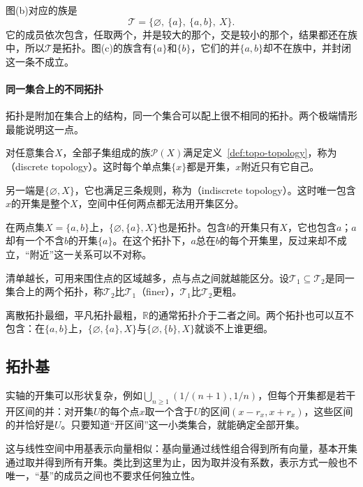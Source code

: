 图(b)对应的族是
\[
 \mathcal T=\bigl\{\varnothing,\ \{a\},\ \{a,b\},\ X\bigr\}.
\]
它的成员依次包含，任取两个，并是较大的那个，交是较小的那个，结果都还在族中，所以$\mathcal T$是拓扑。图(c)的族含有$\{a\}$和$\{b\}$，它们的并$\{a,b\}$却不在族中，并封闭这一条不成立。

\paragraph{同一集合上的不同拓扑}
拓扑是附加在集合上的结构，同一个集合可以配上很不相同的拓扑。两个极端情形最能说明这一点。

\begin{example}[离散拓扑与平凡拓扑]
\label{ex:topo-discrete-indiscrete}
对任意集合$X$，全部子集组成的族$\mathcal P(X)$满足定义~\ref{def:topo-topology}，称为（discrete topology）。这时每个单点集$\{x\}$都是开集，$x$附近只有它自己。

另一端是$\{\varnothing,X\}$，它也满足三条规则，称为（indiscrete topology）。这时唯一包含$x$的开集是整个$X$，空间中任何两点都无法用开集区分。

在两点集$X=\{a,b\}$上，$\{\varnothing,\{a\},X\}$也是拓扑。包含$b$的开集只有$X$，它也包含$a$；$a$却有一个不含$b$的开集$\{a\}$。在这个拓扑下，$a$总在$b$的每个开集里，反过来却不成立，“附近”这一关系可以不对称。
\end{example}

清单越长，可用来围住点的区域越多，点与点之间就越能区分。设$\mathcal T_1\subseteq\mathcal T_2$是同一集合上的两个拓扑，称$\mathcal T_2$比$\mathcal T_1$（finer），$\mathcal T_1$比$\mathcal T_2$更粗。

离散拓扑最细，平凡拓扑最粗，$\mathbb R$的通常拓扑介于二者之间。两个拓扑也可以互不包含：在$\{a,b\}$上，$\{\varnothing,\{a\},X\}$与$\{\varnothing,\{b\},X\}$就谈不上谁更细。

\subsection{拓扑基}
\label{sec:topo-basis}

实轴的开集可以形状复杂，例如$\bigcup_{n\geq1}(1/(n+1),1/n)$，但每个开集都是若干开区间的并：对开集$U$的每个点$x$取一个含于$U$的区间$(x-r_x,x+r_x)$，这些区间的并恰好是$U$。只要知道“开区间”这一小类集合，就能确定全部开集。

这与线性空间中用基表示向量相似：基向量通过线性组合得到所有向量，基本开集通过取并得到所有开集。类比到这里为止，因为取并没有系数，表示方式一般也不唯一，“基”的成员之间也不要求任何独立性。

